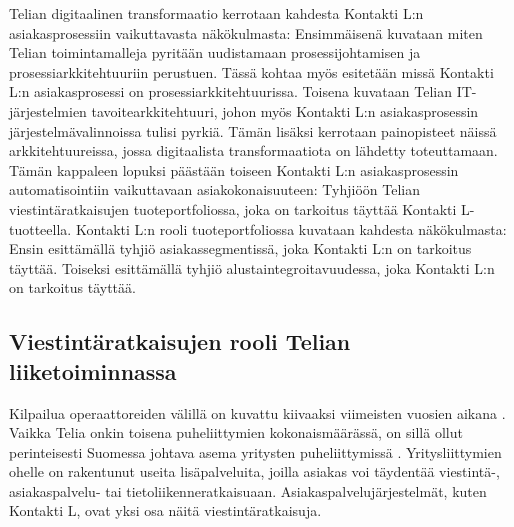 \documentclass[finnish,12pt,a4paper,pdftex]{article}
\begin{document}
\noindent Telian digitaalinen transformaatio kerrotaan kahdesta Kontakti L:n asiakasprosessiin vaikuttavasta näkökulmasta: Ensimmäisenä kuvataan miten Telian toimintamalleja pyritään uudistamaan prosessijohtamisen ja prosessiarkkitehtuuriin perustuen. Tässä kohtaa myös esitetään missä Kontakti L:n asiakasprosessi on prosessiarkkitehtuurissa. Toisena kuvataan Telian IT-järjestelmien tavoitearkkitehtuuri, johon myös Kontakti L:n asiakasprosessin järjestelmävalinnoissa tulisi pyrkiä. Tämän lisäksi kerrotaan painopisteet näissä arkkitehtuureissa, jossa digitaalista transformaatiota on lähdetty toteuttamaan.\\

\noindent Tämän kappaleen lopuksi päästään toiseen Kontakti L:n asiakasprosessin automatisointiin vaikuttavaan asiakokonaisuuteen: Tyhjiöön Telian viestintäratkaisujen tuoteportfoliossa, joka on tarkoitus täyttää Kontakti L-tuotteella. Kontakti L:n rooli tuoteportfoliossa kuvataan kahdesta näkökulmasta: Ensin esittämällä tyhjiö asiakassegmentissä, joka Kontakti L:n on tarkoitus täyttää. Toiseksi esittämällä tyhjiö alustaintegroitavuudessa, joka Kontakti L:n on tarkoitus täyttää.





\subsection{Viestintäratkaisujen rooli Telian liiketoiminnassa}

 Kilpailua operaattoreiden välillä on kuvattu kiivaaksi viimeisten vuosien aikana \citep{hesari}. Vaikka Telia onkin toisena puheliittymien kokonaismäärässä, on sillä ollut perinteisesti Suomessa johtava asema yritysten puheliittymissä \citep{hesari}. Yritysliittymien ohelle on rakentunut useita lisäpalveluita, joilla asiakas voi täydentää viestintä-, asiakaspalvelu- tai tietoliikenneratkaisuaan. Asiakaspalvelujärjestelmät, kuten Kontakti L, ovat yksi osa näitä viestintäratkaisuja.\\
 
\end{document}
